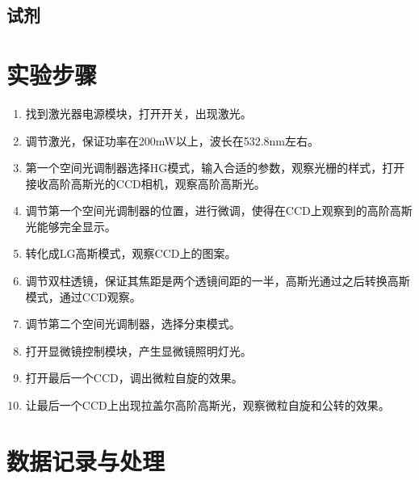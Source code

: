 \documentclass[UTF8,12pt,a4paper]{article}
\begin{document}
\subsection{试剂}

\section{实验步骤}
\begin{enumerate}
	\renewcommand{\labelenumi}{\textcolor{red}{\theenumi.}}
	\item 找到激光器电源模块，打开开关，出现激光。
	\item 调节激光，保证功率在200mW以上，波长在532.8nm左右。
	\item 第一个空间光调制器选择HG模式，输入合适的参数，观察光栅的样式，打开接收高阶高斯光的CCD相机，观察高阶高斯光。
	\item 调节第一个空间光调制器的位置，进行微调，使得在CCD上观察到的高阶高斯光能够完全显示。
	\item 转化成LG高斯模式，观察CCD上的图案。
	\item 调节双柱透镜，保证其焦距是两个透镜间距的一半，高斯光通过之后转换高斯模式，通过CCD观察。
	\item 调节第二个空间光调制器，选择分束模式。
	\item 打开显微镜控制模块，产生显微镜照明灯光。
	\item 打开最后一个CCD，调出微粒自旋的效果。
	\item 让最后一个CCD上出现拉盖尔高阶高斯光，观察微粒自旋和公转的效果。
\end{enumerate}


\section{数据记录与处理}
\end{document}
